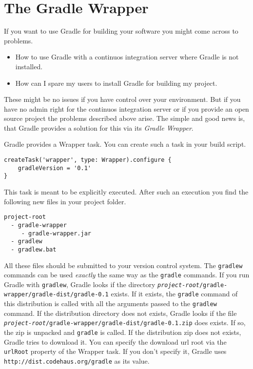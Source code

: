 \chapter{The Gradle Wrapper} %
\label{cha:the_gradle_wrapper}
If you want to use Gradle for building your software you might come across to problems. 
\begin{itemize}
	\item How to use Gradle with a continuos integration server where Gradle is not installed.
	\item How can I spare my users to install Gradle for building my project.
\end{itemize}
These might be no issues if you have control over your environment. But if you have no admin right for the continuos integration server or if you provide an open source project the problems described above arise. The simple and good news is, that Gradle provides a solution for this via its \emph{Gradle Wrapper}.

Gradle provides a Wrapper task. You can create such a task in your build script.

\begin{Verbatim}
createTask('wrapper', type: Wrapper).configure {
    gradleVersion = '0.1'
}	
\end{Verbatim}
This task is meant to be explicitly executed. After such an execution you find the following new files in your project folder.
\begin{Verbatim}
project-root
  - gradle-wrapper
     - gradle-wrapper.jar
  - gradlew
  - gradlew.bat
\end{Verbatim}
\noindent
All these files should be submitted to your version control system. The \texttt{gradlew} commands can be used \emph{exactly} the same way as the \texttt{gradle} commands. If you run Gradle with \texttt{gradlew}, Gradle looks if the directory \texttt{\emph{project-root}/gradle-wrapper/gradle-dist/gradle-0.1} exists. If it exists, the \texttt{gradle} command of this distribution is called with all the arguments passed to the \texttt{gradlew} command.
If the distribution directory does not exists, Gradle looks if the file \texttt{\emph{project-root}/gradle-wrapper/gradle-dist/gradle-0.1.zip} does exists. If so, the zip is unpacked and \texttt{gradle} is called. If the distribution zip does not exists, Gradle tries to download it. You can specify the download url root via the \texttt{urlRoot} property of the Wrapper task. If you don't specify it, Gradle uses \texttt{http://dist.codehaus.org/gradle} as its value. 

